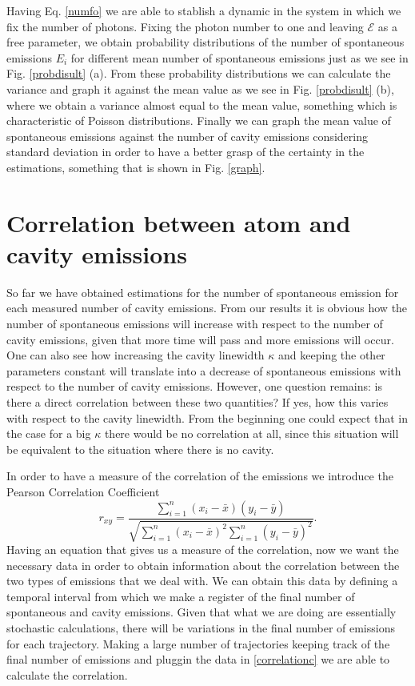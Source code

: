 \documentclass[conference]{IEEEtran}
\begin{document}
Having Eq. \eqref{numfo} we are able to stablish a dynamic in the system in which we fix the number of photons. Fixing the photon number to one and leaving $\mathcal{E}$ as a free parameter, we obtain probability distributions of the number of spontaneous emissions $E_i$ for different mean number of spontaneous emissions just as we see in Fig. \ref{probdisult} (a). From these probability distributions we can calculate the variance and graph it against the mean value as we see in Fig. \ref{probdisult} (b), where we obtain a variance almost equal to the mean value, something which is characteristic of Poisson distributions. 
Finally we can graph the mean value of spontaneous emissions against the number of cavity emissions considering standard deviation in order to have a better grasp of the certainty in the estimations, something that is shown in Fig. \ref{graph}.

\section{Correlation between atom and cavity emissions}
So far we have obtained estimations for the number of spontaneous emission for each measured number of cavity emissions. From our results it is obvious how the number of spontaneous emissions will increase with respect to the number of cavity emissions, given that more time will pass and more emissions will occur. One can also see how increasing the cavity linewidth $\kappa$ and keeping the other parameters constant will translate into a decrease of spontaneous emissions with respect to the number of cavity emissions. However, one question remains: is there a direct correlation between these two quantities? If yes, how this varies with respect to the cavity linewidth. From the beginning one could expect that in the case for a big $\kappa$ there would be no correlation at all, since this situation will be equivalent to the situation where there is no cavity. 

In order to have a measure of the correlation of the emissions we introduce the Pearson Correlation Coefficient \cite{benesty2009pearson}
\begin{equation} 
r_{xy} = \frac{\sum\limits_{i=1}^n(x_i - \bar{x})(y_i - \bar{y})}{\sqrt{\sum\limits_{i=1}^n(x_i - \bar{x})^2\sum\limits_{i=1}^n(y_i - \bar{y})^2}}.  \label{correlationc}
\end{equation}
Having an equation that gives us a measure of the correlation, now we want the necessary data in order to obtain information about the correlation between the two types of emissions that we deal with. We can obtain this data by defining a temporal interval from which we make a register of the final number of spontaneous and cavity emissions. Given that what we are doing are essentially stochastic calculations, there will be variations in the final number of emissions for each trajectory. Making a large number of trajectories keeping track of the final number of emissions and pluggin the data in \eqref{correlationc} we are able to calculate the correlation.
\end{document}
